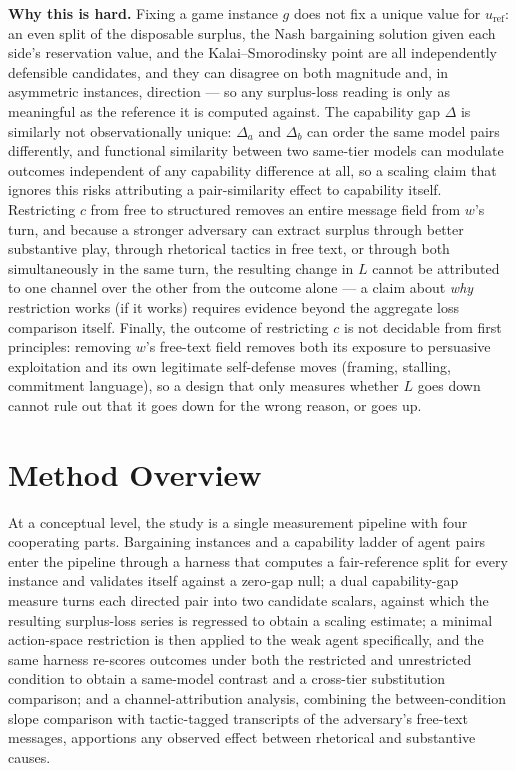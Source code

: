 \documentclass[11pt]{article}
\begin{document}
\noindent\textbf{Why this is hard.} Fixing a game instance $g$ does not fix a unique value for $u_{\mathrm{ref}}$: an even split of the disposable surplus, the Nash bargaining solution given each side's reservation value, and the Kalai--Smorodinsky point are all independently defensible candidates, and they can disagree on both magnitude and, in asymmetric instances, direction --- so any surplus-loss reading is only as meaningful as the reference it is computed against. The capability gap $\Delta$ is similarly not observationally unique: $\Delta_a$ and $\Delta_b$ can order the same model pairs differently, and functional similarity between two same-tier models can modulate outcomes independent of any capability difference at all, so a scaling claim that ignores this risks attributing a pair-similarity effect to capability itself. Restricting $c$ from free to structured removes an entire message field from $w$'s turn, and because a stronger adversary can extract surplus through better substantive play, through rhetorical tactics in free text, or through both simultaneously in the same turn, the resulting change in $L$ cannot be attributed to one channel over the other from the outcome alone --- a claim about \emph{why} restriction works (if it works) requires evidence beyond the aggregate loss comparison itself. Finally, the outcome of restricting $c$ is not decidable from first principles: removing $w$'s free-text field removes both its exposure to persuasive exploitation and its own legitimate self-defense moves (framing, stalling, commitment language), so a design that only measures whether $L$ goes down cannot rule out that it goes down for the wrong reason, or goes up.

\section{Method Overview}

At a conceptual level, the study is a single measurement pipeline with four cooperating parts. Bargaining instances and a capability ladder of agent pairs enter the pipeline through a harness that computes a fair-reference split for every instance and validates itself against a zero-gap null; a dual capability-gap measure turns each directed pair into two candidate scalars, against which the resulting surplus-loss series is regressed to obtain a scaling estimate; a minimal action-space restriction is then applied to the weak agent specifically, and the same harness re-scores outcomes under both the restricted and unrestricted condition to obtain a same-model contrast and a cross-tier substitution comparison; and a channel-attribution analysis, combining the between-condition slope comparison with tactic-tagged transcripts of the adversary's free-text messages, apportions any observed effect between rhetorical and substantive causes.
\end{document}
